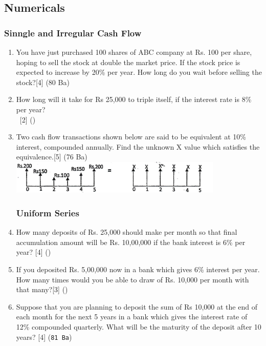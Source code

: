 \documentclass[12pt]{article}
\newcommand{\enter}{\\\textcolor{white}{1}}
\begin{document}
	\subsection{Numericals}
		\subsubsection{Sinngle and Irregular Cash Flow}
		\begin{enumerate}[noitemsep, topsep=0pt]
			\item You have just purchased 100 shares of ABC company at Rs. 100 per share, hoping to sell the stock at double the market price. If the stock price is expected to increase by 20\% per year. How long do you wait before selling the stock?\hfill[4] (80 Ba)

			\item How long will it take for Rs 25,000 to triple itself, if the interest rate is 8\% per year?
			\enter\hfill[2] ()

			\item Two cash flow transactions shown below are said to be equivalent at 10\% interest, compounded annually. Find the unknown X value which satisfies the equivalence.\hfill [5] (76 Ba)\\
			\includegraphics[width=4in]{./pics/ee_1}
		
		\subsubsection{Uniform Series}
			\item How many deposits of Rs. 25,000 should make per month so that final accumulation amount will be Rs. 10,00,000 if the bank interest is 6\% per year? \hfill[4] ()

			\item If you deposited Rs. 5,00,000 now in a bank which gives 6\% interest per year. How many times would you be able to draw of Rs. 10,000 per month with that many?\hfill[3] ()
	
			\item Suppose that you are planning to deposit the sum of Rs 10,000 at the end of each month for the next 5 years in a bank which gives the interest rate of 12\% compounded quarterly. What will be the maturity of the deposit after 10 years? \hfill[4] (\texttt{81 Ba})


\end{enumerate}
\end{document}
